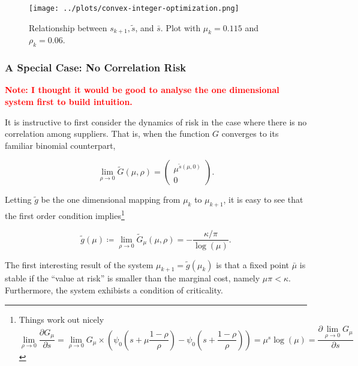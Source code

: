 \documentclass[american, abstract=on]{scrartcl}
\theoremstyle{plain}
\newcommand\notes[1]{\textcolor{red}{\textbf{#1}}}
\begin{document}
\begin{figure}[H]
  \centering
  \texttt{[image: ../plots/convex-integer-optimization.png]}
  \caption{Relationship between $s_{k + 1}, \tilde{s}$, and $\bar{s}$. Plot with $\mu_k = 0.115$ and $\rho_k = 0.06$.}
  \label{fig:convex-integer-optimization}
\end{figure}

\subsubsection{A Special Case: No Correlation Risk}

\notes{Note: I thought it would be good to analyse the one dimensional system first to build intuition.}

It is instructive to first consider the dynamics of risk in the case where there is no correlation among suppliers. That is, when the function $G$ converges to its familiar binomial counterpart,

\begin{equation}
   \lim_{\rho \rightarrow 0} \tilde{G}(\mu, \rho) = \begin{pmatrix} \mu^{\tilde{s}(\mu, 0)} \\ 0 \end{pmatrix}.
\end{equation}

Letting $\tilde{g}$ be the one dimensional mapping from $\mu_{k}$ to $\mu_{k + 1}$, it is easy to see that the first order condition implies\footnote{
  Things work out nicely
\begin{equation}
  \lim_{\rho \rightarrow 0} \frac{\partial G_\mu}{\partial s} = \lim_{\rho \rightarrow 0} G_\mu \times \left(\psi_0\left(s + \mu \frac{1 - \rho}{\rho} \right) - \psi_0\left(s + \frac{1 - \rho}{\rho} \right) \right) = \mu^{s} \log(\mu) = \frac{\partial \lim_{\rho \rightarrow 0} G_{\mu}}{\partial s}
\end{equation}
}

\begin{equation}
  \tilde{g}(\mu) \coloneqq \lim_{\rho \rightarrow 0}\tilde{G}_\mu(\mu, \rho) = -\frac{\kappa / \pi}{\log(\mu)}.
\end{equation}

The first interesting result of the system $\mu_{k + 1} = \tilde{g}(\mu_k)$ is that a fixed point $\bar{\mu}$ is stable if the ``value at risk'' is smaller than the marginal cost, namely $\mu \pi < \kappa$. Furthermore, the system exhibists a condition of criticality. 
\end{document}
